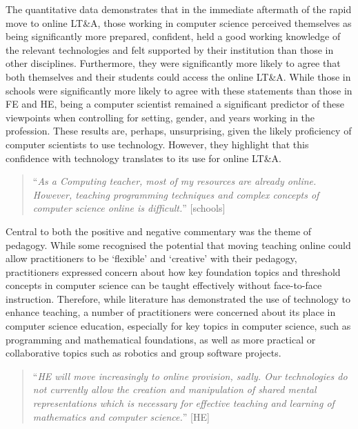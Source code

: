 \documentclass[sigconf]{acmart}
\begin{document}
The quantitative data demonstrates that in the immediate aftermath of
the rapid move to online LT\&A, those working in computer science
perceived themselves as being significantly more prepared, confident,
held a good working knowledge of the relevant technologies and felt
supported by their institution than those in other
disciplines. Furthermore, they were significantly more likely to agree
that both themselves and their students could access the online
LT\&A. While those in schools were significantly more likely to agree
with these statements than those in FE and HE, being a computer
scientist remained a significant predictor of these viewpoints when
controlling for setting, gender, and years working in the profession.
These results are, perhaps, unsurprising, given the likely proficiency of
computer scientists to use technology. However, they highlight that
this confidence with technology translates to its use for online LT\&A.

\begin{quotation}
``{\emph{As a Computing teacher, most of my resources are already
online. However, teaching programming techniques and complex concepts
of computer science online is difficult.}}'' [schools]
\end{quotation}

Central to both the positive and negative commentary was the theme of
pedagogy. While some recognised the potential that moving teaching
online could allow practitioners to be `flexible' and `creative' with
their pedagogy, practitioners expressed concern about how key
foundation topics and threshold concepts in computer science can be
taught effectively without face-to-face instruction. Therefore, while
literature has demonstrated the use of technology to enhance teaching,
a number of practitioners were concerned about its place in computer
science education, especially for key topics in computer science, such
as programming and mathematical foundations, as well as more practical
or collaborative topics such as robotics and group software projects.


\begin{quotation}
``{\emph{HE will move increasingly to online provision, sadly.  Our
technologies do not currently allow the creation and manipulation of
shared mental representations which is necessary for effective
teaching and learning of mathematics and computer science.}}'' [HE]
\end{quotation}
\end{document}
